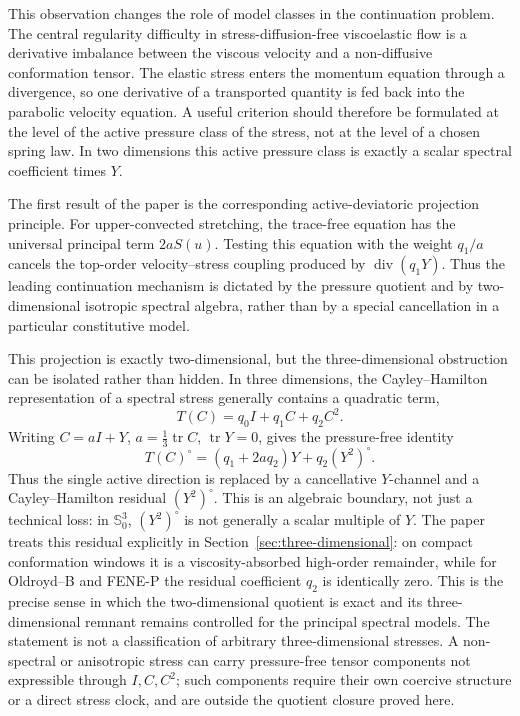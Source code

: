\documentclass[11pt]{article}
\newcommand{\Sym}{\mathbb S}
\newcommand{\tr}{\operatorname{tr}}
\newcommand{\divv}{\operatorname{div}}
\begin{document}
This observation changes the role of model classes in the continuation
problem.  The central regularity difficulty in stress-diffusion-free
viscoelastic flow is a derivative imbalance between the viscous velocity and a
non-diffusive conformation tensor.  The elastic stress enters the momentum
equation through a divergence, so one derivative of a transported quantity is
fed back into the parabolic velocity equation.  A useful criterion should
therefore be formulated at the level of the active pressure class of the
stress, not at the level of a chosen spring law.  In two dimensions this active
pressure class is exactly a scalar spectral coefficient times \(Y\).

The first result of the paper is the corresponding active-deviatoric
projection principle.  For upper-convected stretching, the trace-free equation
has the universal principal term \(2aS(u)\).  Testing this equation with the
weight \(q_1/a\) cancels the top-order velocity--stress coupling produced by
\(\divv(q_1Y)\).  Thus the leading continuation mechanism is dictated by the
pressure quotient and by two-dimensional isotropic spectral algebra, rather
than by a special cancellation in a particular constitutive model.

This projection is exactly two-dimensional, but the three-dimensional obstruction
can be isolated rather than hidden.  In three dimensions, the Cayley--Hamilton
representation of a spectral stress generally contains a quadratic term,
\[
  T(C)=q_0I+q_1C+q_2C^2 .
\]
Writing \(C=aI+Y\), \(a=\frac13\tr C\), \(\tr Y=0\), gives the pressure-free
identity
\[
  T(C)^\circ=(q_1+2aq_2)Y+q_2(Y^2)^\circ .
\]
Thus the single active direction is replaced by a cancellative \(Y\)-channel
and a Cayley--Hamilton residual \((Y^2)^\circ\).  This is an algebraic boundary,
not just a technical loss: in \(\Sym^3_0\), \((Y^2)^\circ\) is not generally a
scalar multiple of \(Y\).  The paper treats this residual explicitly in
Section~\ref{sec:three-dimensional}: on compact conformation windows it is a
viscosity-absorbed high-order remainder, while for Oldroyd--B and FENE-P the
residual coefficient \(q_2\) is identically zero.  This is the precise sense in
which the two-dimensional quotient is exact and its three-dimensional remnant
remains controlled for the principal spectral models.  The statement is not a
classification of arbitrary three-dimensional stresses.  A non-spectral or anisotropic stress can carry pressure-free tensor
components not expressible through \(I,C,C^2\); such components require their
own coercive structure or a direct stress clock, and are outside the quotient
closure proved here.
\end{document}

